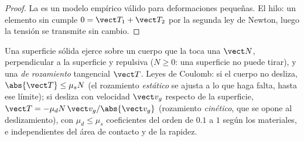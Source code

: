 \begin{proof}
La  es un modelo empírico válido para deformaciones pequeñas.
El hilo: un elemento sin  cumple $0 = \vect T_1 + \vect T_2$ por la
segunda ley de Newton, luego la tensión se transmite sin cambio.
\end{proof}

\begin{proposition}\label{prop:b1:newton-dynamics:friction}
Una superficie sólida ejerce sobre un cuerpo que la toca una
\emph{} $\vect N$, perpendicular a la superficie y
repulsiva ($N \geq 0$: una superficie no puede tirar), y una \emph{
de rozamiento} tangencial $\vect T$. Leyes de Coulomb: si el cuerpo no
desliza, $\abs{\vect T} \leq \mu_s N$ (el rozamiento \emph{estático} se
ajusta a lo que haga falta, hasta ese límite); si desliza con velocidad
$\vect v_g$ respecto de la superficie,
$\vect T = -\mu_d N\,\vect v_g/\abs{\vect v_g}$ (rozamiento
\emph{cinético}, que se opone al deslizamiento), con $\mu_d \leq \mu_s$
coeficientes del orden de $0.1$ a $1$ según los materiales, e
independientes del área de contacto y de la rapidez.
\end{proposition}
\admitted

